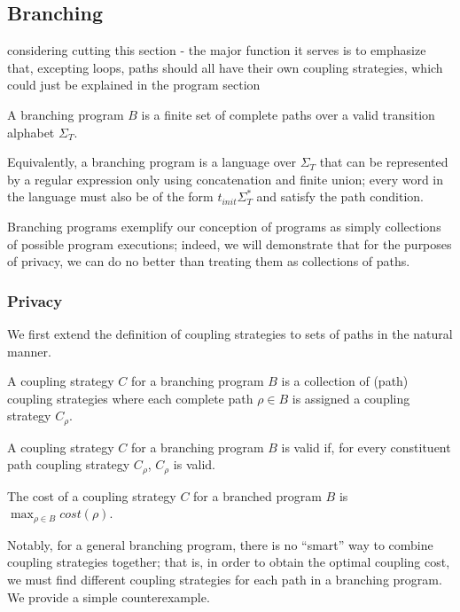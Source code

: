 
\subsection{Branching} 
{\color{red} considering cutting this section - the major function it serves is to emphasize that, excepting loops, paths should all have their own coupling strategies, which could just be explained in the program section}


\begin{defn}
    A branching program $B$ is a finite set of complete paths over a valid transition alphabet $\Sigma_T$.
\end{defn}

Equivalently, a branching program is a language over $\Sigma_T$ that can be represented by a regular expression only using concatenation and finite union; every word in the language must also be of the form $t_{init}\Sigma_T^*$ and satisfy the path condition. 

Branching programs exemplify our conception of programs as simply collections of possible program executions; indeed, we will demonstrate that for the purposes of privacy, we can do no better than treating them as collections of paths.

\subsubsection{Privacy}

We first extend the definition of coupling strategies to sets of paths in the natural manner.

\begin{defn}
    A coupling strategy $C$ for a branching program $B$ is a collection of (path) coupling strategies where each complete path $\rho\in B$ is assigned a coupling strategy $C_\rho$. 
\end{defn}

\begin{defn}
    A coupling strategy $C$ for a branching program $B$ is valid if, for every constituent path coupling strategy $C_\rho$, $C_\rho$ is valid. 
\end{defn}

\begin{defn}
    The cost of a coupling strategy $C$ for a branched program $B$ is $\max_{\rho\in B}cost(\rho)$.
\end{defn}

Notably, for a general branching program, there is no ``smart'' way to combine coupling strategies together; that is, in order to obtain the optimal coupling cost, we must find different coupling strategies for each path in a branching program. We provide a simple counterexample.

